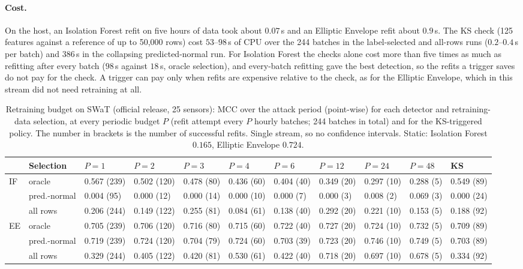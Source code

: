 \documentclass[11pt]{article}
\begin{document}
\paragraph{Cost.} On the host, an Isolation Forest refit on five hours of data took about
$0.07$\,s and an Elliptic Envelope refit about $0.9$\,s. The KS check (125 features against
a reference of up to 50{,}000 rows) cost $53$--$98$\,s of CPU over the 244 batches in the
label-selected and all-rows runs ($0.2$--$0.4$\,s per batch) and $386$\,s in the collapsing
predicted-normal run. For Isolation Forest the checks alone cost more than five times as much
as refitting after every batch ($98$\,s against $18$\,s, oracle selection), and every-batch
refitting gave the best detection, so the refits a trigger saves do not pay for the check. A
trigger can pay only when refits are expensive relative to the check, as for the Elliptic
Envelope, which in this stream did not need retraining at all.

\begin{table}[t]
\centering\small
\caption{Retraining budget on SWaT (official release, 25 sensors): MCC over the attack
period (point-wise) for each detector and retraining-data selection, at every periodic
budget $P$ (refit attempt every $P$ hourly batches; 244 batches in total) and for the
KS-triggered policy. The number in brackets is the number of successful refits. Single
stream, so no confidence intervals. Static:
Isolation Forest $0.165$, Elliptic Envelope $0.724$.}
\label{tab:drift}
\begin{tabular}{lllllllllll}
\toprule
 & Selection & $P{=}1$ & $P{=}2$ & $P{=}3$ & $P{=}4$ & $P{=}6$ & $P{=}12$ & $P{=}24$ & $P{=}48$ & KS \\
\midrule
IF & oracle & 0.567 (239) & 0.502 (120) & 0.478 (80) & 0.436 (60) & 0.404 (40) & 0.349 (20) & 0.297 (10) & 0.288 (5) & 0.549 (89) \\
 & pred.-normal & 0.004 (95) & 0.000 (12) & 0.000 (14) & 0.000 (10) & 0.000 (7) & 0.000 (3) & 0.008 (2) & 0.069 (3) & 0.000 (24) \\
 & all rows & 0.206 (244) & 0.149 (122) & 0.255 (81) & 0.084 (61) & 0.138 (40) & 0.292 (20) & 0.221 (10) & 0.153 (5) & 0.188 (92) \\
EE & oracle & 0.705 (239) & 0.706 (120) & 0.716 (80) & 0.715 (60) & 0.722 (40) & 0.727 (20) & 0.724 (10) & 0.732 (5) & 0.709 (89) \\
 & pred.-normal & 0.719 (239) & 0.724 (120) & 0.704 (79) & 0.724 (60) & 0.703 (39) & 0.723 (20) & 0.746 (10) & 0.749 (5) & 0.703 (89) \\
 & all rows & 0.329 (244) & 0.405 (122) & 0.420 (81) & 0.530 (61) & 0.422 (40) & 0.718 (20) & 0.697 (10) & 0.678 (5) & 0.334 (92) \\
\bottomrule
\end{tabular}
\end{table}
\end{document}
